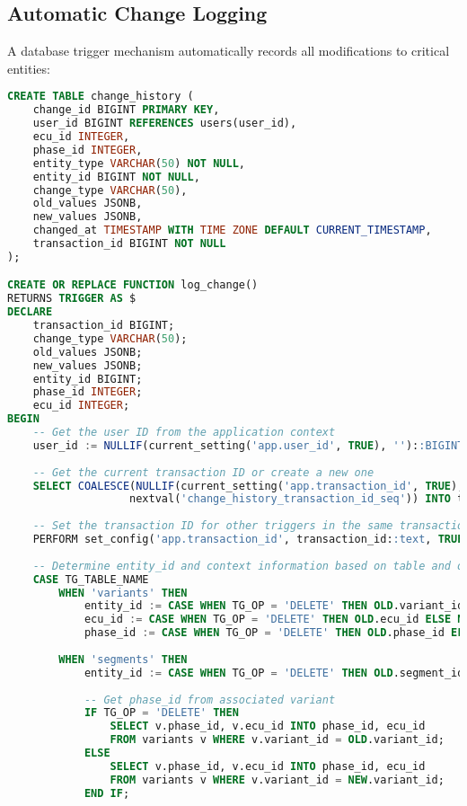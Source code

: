 \subsection{Automatic Change Logging}
\label{subsec:automatic-change-logging}

A database trigger mechanism automatically records all modifications to critical entities:

\begin{lstlisting}[language=SQL, caption={Change Tracking Trigger}, label={lst:change-tracking-trigger}]
CREATE TABLE change_history (
    change_id BIGINT PRIMARY KEY,
    user_id BIGINT REFERENCES users(user_id),
    ecu_id INTEGER,
    phase_id INTEGER,
    entity_type VARCHAR(50) NOT NULL,
    entity_id BIGINT NOT NULL,
    change_type VARCHAR(50),
    old_values JSONB,
    new_values JSONB,
    changed_at TIMESTAMP WITH TIME ZONE DEFAULT CURRENT_TIMESTAMP,
    transaction_id BIGINT NOT NULL
);

CREATE OR REPLACE FUNCTION log_change()
RETURNS TRIGGER AS $
DECLARE
    transaction_id BIGINT;
    change_type VARCHAR(50);
    old_values JSONB;
    new_values JSONB;
    entity_id BIGINT;
    phase_id INTEGER;
    ecu_id INTEGER;
BEGIN
    -- Get the user ID from the application context
    user_id := NULLIF(current_setting('app.user_id', TRUE), '')::BIGINT;
    
    -- Get the current transaction ID or create a new one
    SELECT COALESCE(NULLIF(current_setting('app.transaction_id', TRUE), '')::BIGINT, 
                   nextval('change_history_transaction_id_seq')) INTO transaction_id;
    
    -- Set the transaction ID for other triggers in the same transaction
    PERFORM set_config('app.transaction_id', transaction_id::text, TRUE);
    
    -- Determine entity_id and context information based on table and operation
    CASE TG_TABLE_NAME 
        WHEN 'variants' THEN 
            entity_id := CASE WHEN TG_OP = 'DELETE' THEN OLD.variant_id ELSE NEW.variant_id END;
            ecu_id := CASE WHEN TG_OP = 'DELETE' THEN OLD.ecu_id ELSE NEW.ecu_id END;
            phase_id := CASE WHEN TG_OP = 'DELETE' THEN OLD.phase_id ELSE NEW.phase_id END;
            
        WHEN 'segments' THEN 
            entity_id := CASE WHEN TG_OP = 'DELETE' THEN OLD.segment_id ELSE NEW.segment_id END;
            
            -- Get phase_id from associated variant
            IF TG_OP = 'DELETE' THEN
                SELECT v.phase_id, v.ecu_id INTO phase_id, ecu_id 
                FROM variants v WHERE v.variant_id = OLD.variant_id;
            ELSE
                SELECT v.phase_id, v.ecu_id INTO phase_id, ecu_id 
                FROM variants v WHERE v.variant_id = NEW.variant_id;
            END IF;
            

\end{lstlisting}
